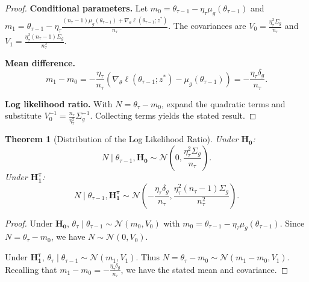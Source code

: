 \documentclass{article}
\theoremstyle{plain}
\newtheorem{theorem}{Theorem}[section]
\theoremstyle{definition}
\theoremstyle{remark}
\begin{document}
\begin{proof}
    \textbf{Conditional parameters.}
    Let $m_0 = \theta_{\tau-1} - \eta_\tau \mu_g(\theta_{\tau-1})$ and $m_1 = \theta_{\tau-1} - \eta_\tau \frac{(n_\tau-1)\mu_g(\theta_{\tau-1}) + \nabla_\theta \ell(\theta_{\tau-1}; z^*)}{n_\tau}$.
    The covariances are $V_0 = \frac{\eta_\tau^2 \Sigma_g}{n_\tau}$ and $V_1 = \frac{\eta_\tau^2 (n_\tau-1)\Sigma_g}{n_\tau^2}$.

    \textbf{Mean difference.}
    \begin{equation*}
        m_1 - m_0 = -\frac{\eta_\tau}{n_\tau}(\nabla_\theta \ell(\theta_{\tau-1}; z^*) - \mu_g(\theta_{\tau-1})) = -\frac{\eta_\tau \delta_g}{n_\tau}.
    \end{equation*}

    \textbf{Log likelihood ratio.}
    With $N = \theta_\tau - m_0$, expand the quadratic terms and substitute $V_0^{-1} = \frac{n_\tau}{\eta_\tau^2}\Sigma_g^{-1}$. Collecting terms yields the stated result.
\end{proof}

\begin{theorem}[Distribution of the Log Likelihood Ratio]
    \label{thm:sgd-log-lr-distribution}
    Under $\mathbf{H_0}$:
    \begin{equation*}
        N \mid \theta_{\tau-1}, \mathbf{H_0} \sim \mathcal{N}\left(0, \frac{\eta_\tau^2 \Sigma_g}{n_\tau}\right).
    \end{equation*}
    Under $\mathbf{H_1^\tau}$:
    \begin{equation*}
        N \mid \theta_{\tau-1}, \mathbf{H_1^\tau} \sim \mathcal{N}\left(-\frac{\eta_\tau \delta_g}{n_\tau}, \frac{\eta_\tau^2(n_\tau-1)\Sigma_g}{n_\tau^2}\right).
    \end{equation*}
\end{theorem}

\begin{proof}
    Under $\mathbf{H_0}$, $\theta_\tau \mid \theta_{\tau-1} \sim \mathcal{N}(m_0, V_0)$ with $m_0 = \theta_{\tau-1} - \eta_\tau \mu_g(\theta_{\tau-1})$. Since $N = \theta_\tau - m_0$, we have $N \sim \mathcal{N}(0, V_0)$.

    Under $\mathbf{H_1^\tau}$, $\theta_\tau \mid \theta_{\tau-1} \sim \mathcal{N}(m_1, V_1)$. Thus $N = \theta_\tau - m_0 \sim \mathcal{N}(m_1 - m_0, V_1)$.
    Recalling that $m_1 - m_0 = -\frac{\eta_\tau \delta_g}{n_\tau}$, we have the stated mean and covariance.
\end{proof}
\end{document}
